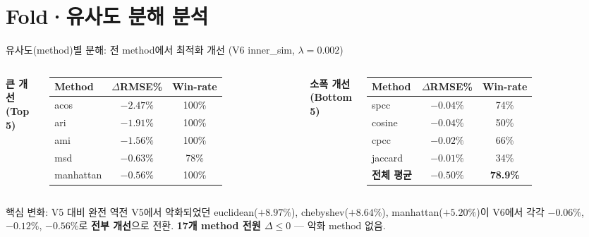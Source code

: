 \documentclass[aspectratio=169,10pt]{beamer}
\begin{document}
\section{Fold·유사도 분해 분석}

\begin{frame}[shrink=5]{유사도(method)별 분해: 전 method에서 최적화 개선 \textnormal{\small(V6 inner\_sim, $\lambda=0.002$)}}
	\begin{columns}[T]
			\textbf{큰 개선 (Top 5)}
			\renewcommand{\arraystretch}{1.2}
			\begin{tabular}{l|c|c}
				\toprule
				Method & \(\Delta\)RMSE\% & Win-rate \\
				\midrule
				acos      & $-2.47\%$ & 100\% \\
				ari       & $-1.91\%$ & 100\% \\
				ami       & $-1.56\%$ & 100\% \\
				msd       & $-0.63\%$ & 78\% \\
				manhattan & $-0.56\%$ & 100\% \\
				\bottomrule
			\end{tabular}

			\textbf{소폭 개선 (Bottom 5)}
			\renewcommand{\arraystretch}{1.2}
			\begin{tabular}{l|c|c}
				\toprule
				Method & \(\Delta\)RMSE\% & Win-rate \\
				\midrule
				spcc    & $-0.04\%$ & 74\% \\
				cosine  & $-0.04\%$ & 50\% \\
				cpcc    & $-0.02\%$ & 66\% \\
				jaccard & $-0.01\%$ & 34\% \\
				\midrule
				\textbf{전체 평균} & $\mathbf{-0.50\%}$ & \textbf{78.9\%} \\
				\bottomrule
			\end{tabular}
	\end{columns}

	\vspace{0.4em}
	\begin{exampleblock}{핵심 변화: V5 대비 완전 역전}
		V5에서 악화되었던 euclidean($+8.97\%$), chebyshev($+8.64\%$), manhattan($+5.20\%$)이
		V6에서 각각 $-0.06\%$, $-0.12\%$, $-0.56\%$로 \textbf{전부 개선}으로 전환.
		\textbf{17개 method 전원 $\Delta \leq 0$} --- 악화 method 없음.
	\end{exampleblock}
\end{frame}
\end{document}
